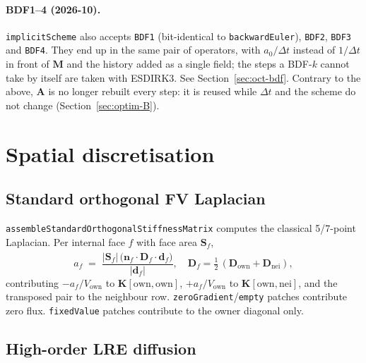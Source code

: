 \documentclass[11pt,a4paper]{article}
\newcommand{\code}[1]{\texttt{\small #1}}
\newcommand{\Dten}{\mathbf{D}}
\newcommand{\Mmass}{\mathbf{M}}
\newcommand{\Kstif}{\mathbf{K}}
\newcommand{\Aimp}{\mathbf{A}}
\begin{document}
\paragraph{BDF1--4 (2026-10).} \code{implicitScheme} also accepts \code{BDF1}
(bit-identical to \code{backwardEuler}), \code{BDF2}, \code{BDF3} and
\code{BDF4}. They end up in the same pair of operators, with $a_0/\Delta t$
instead of $1/\Delta t$ in front of $\Mmass$ and the history added as a single
field; the steps a BDF-$k$ cannot take by itself are taken with ESDIRK3. See
Section~\ref{sec:oct-bdf}. Contrary to the above, $\Aimp$ is no longer rebuilt
every step: it is reused while $\Delta t$ and the scheme do not change
(Section~\ref{sec:optim-B}).

\section{Spatial discretisation}

\subsection{Standard orthogonal FV Laplacian}

\code{assembleStandardOrthogonalStiffnessMatrix} computes the classical
5/7-point Laplacian. Per internal face $f$ with face area $\mathbf{S}_{f}$,
\begin{equation}
  a_{f} \;=\;
   \frac{ \lvert \mathbf{S}_{f} \rvert\,
          \bigl( \mathbf{n}_{f} \cdot \Dten_{f} \cdot \hat{\mathbf{d}}_{f} \bigr) }
        { \lvert \mathbf{d}_{f} \rvert },
   \quad
   \Dten_{f} = \tfrac{1}{2}\,(\Dten_{\text{own}} + \Dten_{\text{nei}}),
\end{equation}
contributing $-a_{f}/V_{\text{own}}$ to $\Kstif[\text{own},\text{own}]$,
$+a_{f}/V_{\text{own}}$ to $\Kstif[\text{own},\text{nei}]$, and the
transposed pair to the neighbour row. \code{zeroGradient}/\code{empty}
patches contribute zero flux. \code{fixedValue} patches contribute to
the owner diagonal only.

\subsection{High-order LRE diffusion}
\end{document}
